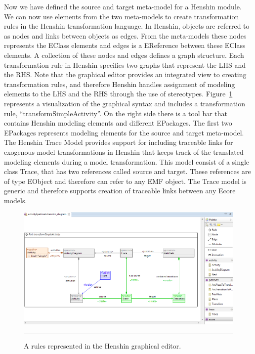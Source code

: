 Now we have defined the source and target meta-model for a Henshin module. We
can now use elements from the two meta-models to create transformation rules in
the Henshin transformation language. In Henshin, objects are referred to as
nodes and links between objects as edges. From the meta-models these nodes
represents the EClass elements and edges is a EReference between these EClass
elements. A collection of these nodes and edges defines a graph structure. Each
transformation rule in Henshin specifies two graphs that represent the LHS and
the RHS. Note that the graphical editor provides an integrated view to creating
transformation rules, and therefore Henshin handles assignment of modeling
elements to the LHS and the RHS through the use of stereotypes.
Figure~\ref{fig:HenshinScreen} represents a visualization of the graphical
syntax and includes a transformation rule, ``transformSimpleActivity''. On the
right side there is a tool bar that contains Henshin modeling elements and
different EPackages. The first two EPackages represents modeling elements for
the source and target meta-model. The Henshin Trace Model provides support for
including traceable links for exogenous model transformations in Henshin that
keeps track of the translated modeling elements during a model transformation.
This model consist of a single class Trace, that has two references called source
and target. These references are of type EObject and therefore can refer to any
EMF object. The Trace model is generic and therefore supports creation of
traceable links between any Ecore models.

\begin{figure}[H]
	\centering
	\includegraphics[scale=0.6]{figures/henshin_scren_2}
	\rule{35em}{0.5pt}
	\caption[The Henshin graphical editor]
	{A rules represented in the Henshin graphical editor.}
	\label{fig:HenshinScreen}
\end{figure}


